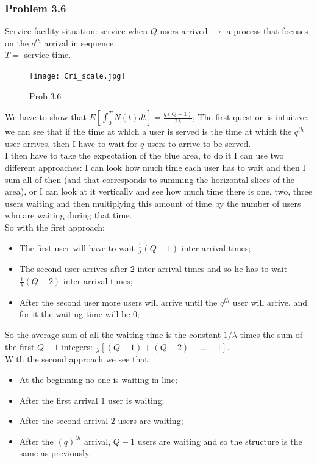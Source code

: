 	\subsubsection*{Problem 3.6}
	Service facility situation: service when $Q$ users arrived $\rightarrow$ a process that focuses on the $q^{th}$ arrival in sequence.\\
	$T = $ service time.
	\begin{figure}
	\centering
	\texttt{[image: Cri\_scale.jpg]}
	\caption{Prob 3.6}
	\end{figure}
	We have to show that $E[\int_{0}^{T}N(t)dt] = \frac{q(Q-1)}{2\lambda}$; The first question is intuitive: we can see that if the time at which a user is served is the time at which the $q^{th}$ user arrives, then I have to wait for $q$ users to arrive to be served.\\
	I then have to take the expectation of the blue area, to do it I can use two different approaches: I can look how much time each user has to wait and then I sum all of then (and that corresponds to summing the horizontal slices of the area), or I can look at it vertically and see how much time there is one, two, three users waiting and then multiplying this amount of time by the number of users who are waiting during that time.\\
	So with the first approach:
	\begin{itemize}
	\item The first user will have to wait $\frac{1}{\lambda}(Q-1)$ inter-arrival times;
	\item The second user arrives after $2$ inter-arrival times and so he has to wait $\frac{1}{\lambda }(Q-2)$ inter-arrival times;
	\item After the second user more users will arrive until the $q^{th}$ user will arrive, and for it the waiting time will be $0$;
	\end{itemize}
	So the average sum of all the waiting time is the constant $1/\lambda$ times  the sum of the first $Q-1$ integers: $\frac{1}{\lambda}[(Q-1)+(Q-2)+\dots+1]$.\\
	With the second approach we see that:
	\begin{itemize}
	\item At the beginning no one is waiting in line;
	\item After the first arrival $1$ user is waiting;
	\item After the second arrival $2$ users are waiting;
	\item After the $(q)^{th}$ arrival, $Q-1$ users are waiting and so the structure is the same as previously.
	\end{itemize}
